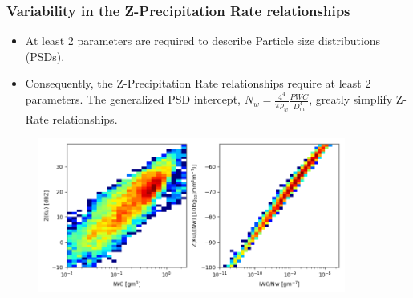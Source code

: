 \documentclass{beamer}
\begin{document}
\begin{frame}
\frametitle{Variability in the Z-Precipitation Rate relationships}
\begin{itemize}
    \item At least 2 parameters are required to describe
    Particle size distributions (PSDs).
    \item Consequently, the Z-Precipitation Rate relationships require at
    least 2 parameters. The generalized PSD intercept, $N_w=\frac {4^4} {\pi \rho_w} \frac {PWC} {D_m^4}$,
    greatly simplify Z-Rate relationships.
\end{itemize}
\begin{figure}
\begin{center}
\includegraphics[width=0.9\textwidth]{Figures/fig2.png}
\end{center}
\end{figure}
\end{frame}
\end{document}
